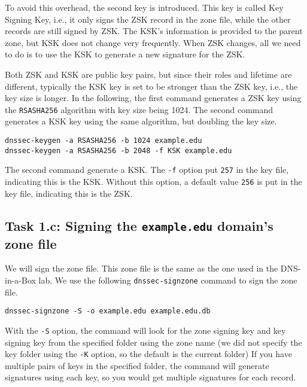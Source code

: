 To avoid this overhead, the second key is introduced. This key is called 
Key Signing Key, i.e., it only signs the ZSK record in the zone file, while the 
other records are still signed by ZSK. The KSK's information is provided to 
the parent zone, but KSK does not change very frequently. When ZSK changes,
all we need to do is to use the KSK to generate a new signature for the ZSK. 

Both ZSK and KSK are public key pairs, but since their roles and lifetime are different,
typically the KSK key is set to be stronger than the ZSK key, i.e., the key size 
is longer. In the following, the first command generates a ZSK key using the 
\texttt{RSASHA256} algorithm with key size being 1024. The second command 
generates a KSK key using the same algorithm, but doubling the key size. 


\begin{lstlisting}
dnssec-keygen -a RSASHA256 -b 1024 example.edu
dnssec-keygen -a RSASHA256 -b 2048 -f KSK example.edu
\end{lstlisting}

The second command generate a KSK. The \texttt{-f} option 
put \texttt{257} in the key file, indicating this is the KSK. 
Without this option, a default value \texttt{256} is put in
the key file, indicating this is the ZSK.




\subsection{Task 1.c: Signing the \texttt{example.edu} domain's zone file} 

We will sign the zone file. This zone file 
is the same as the one used in the DNS-in-a-Box lab. We use the 
following \texttt{dnssec-signzone} command to sign the zone file.  


\begin{lstlisting}
dnssec-signzone -S -o example.edu example.edu.db
\end{lstlisting}
 
With the \texttt{-S} option, the command will look
for the zone signing key and key signing key 
from the specified folder using the zone name (we did not specify the key folder 
using the \texttt{-K} option, so the default is the current folder)
If you have multiple pairs of keys in the specified folder,
the command will generate signatures using each key, so you would get 
multiple signatures for each record. 


